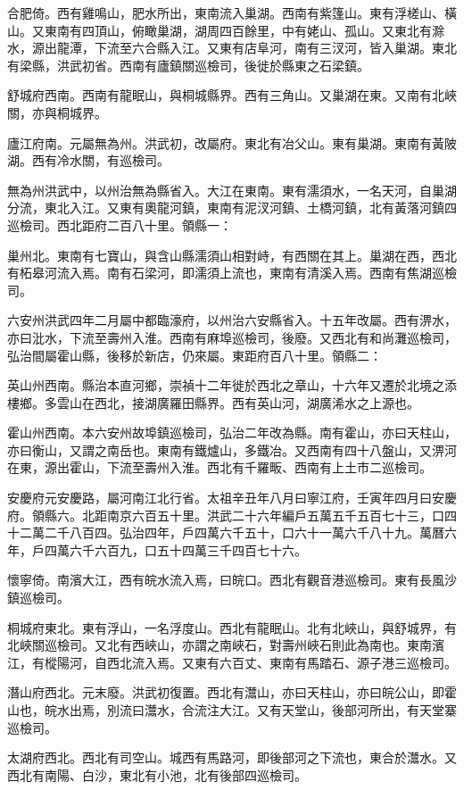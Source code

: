 合肥倚。西有雞鳴山，肥水所出，東南流入巢湖。西南有紫篷山。東有浮槎山、橫山。又東南有四頂山，俯瞰巢湖，湖周四百餘里，中有姥山、孤山。又東北有滁水，源出龍潭，下流至六合縣入江。又東有店阜河，南有三汊河，皆入巢湖。東北有梁縣，洪武初省。西南有廬鎮關巡檢司，後徙於縣東之石梁鎮。

舒城府西南。西南有龍眠山，與桐城縣界。西有三角山。又巢湖在東。又南有北峽關，亦與桐城界。

廬江府南。元屬無為州。洪武初，改屬府。東北有冶父山。東有巢湖。東南有黃陂湖。西有冷水關，有巡檢司。

無為州洪武中，以州治無為縣省入。大江在東南。東有濡須水，一名天河，自巢湖分流，東北入江。又東有奧龍河鎮，東南有泥汊河鎮、土橋河鎮，北有黃落河鎮四巡檢司。西北距府二百八十里。領縣一：

巢州北。東南有七寶山，與含山縣濡須山相對峙，有西關在其上。巢湖在西，西北有柘皋河流入焉。南有石梁河，即濡須上流也，東南有清溪入焉。西南有焦湖巡檢司。

六安州洪武四年二月屬中都臨濠府，以州治六安縣省入。十五年改屬。西有淠水，亦曰沘水，下流至壽州入淮。西南有麻埠巡檢司，後廢。又西北有和尚灘巡檢司，弘治間屬霍山縣，後移於新店，仍來屬。東距府百八十里。領縣二：

英山州西南。縣治本直河鄉，崇禎十二年徙於西北之章山，十六年又遷於北境之添樓鄉。多雲山在西北，接湖廣羅田縣界。西有英山河，湖廣浠水之上源也。

霍山州西南。本六安州故埠鎮巡檢司，弘治二年改為縣。南有霍山，亦曰天柱山，亦曰衡山，又謂之南岳也。東南有鐵爐山，多鐵冶。又西南有四十八盤山，又淠河在東，源出霍山，下流至壽州入淮。西北有千羅畈、西南有上土市二巡檢司。

安慶府元安慶路，屬河南江北行省。太祖辛丑年八月曰寧江府，壬寅年四月曰安慶府。領縣六。北距南京六百五十里。洪武二十六年編戶五萬五千五百七十三，口四十二萬二千八百四。弘治四年，戶四萬六千五十，口六十一萬六千八十九。萬曆六年，戶四萬六千六百九，口五十四萬三千四百七十六。

懷寧倚。南濱大江，西有皖水流入焉，曰皖口。西北有觀音港巡檢司。東有長風沙鎮巡檢司。

桐城府東北。東有浮山，一名浮度山。西北有龍眠山。北有北峽山，與舒城界，有北峽關巡檢司。又北有西峽山，亦謂之南峽石，對壽州峽石則此為南也。東南濱江，有樅陽河，自西北流入焉。又東有六百丈、東南有馬踏石、源子港三巡檢司。

潛山府西北。元末廢。洪武初復置。西北有灊山，亦曰天柱山，亦曰皖公山，即霍山也，皖水出焉，別流曰灊水，合流注大江。又有天堂山，後部河所出，有天堂寨巡檢司。

太湖府西北。西北有司空山。城西有馬路河，即後部河之下流也，東合於灊水。又西北有南陽、白沙，東北有小池，北有後部四巡檢司。

